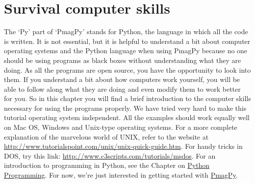 \documentclass[11pt]{book}
\begin{document}
{%
%
%
%





\chapter{Survival computer skills}
\label{ex:unix}

The `Py' part of  `PmagPy' stands for Python, the language in which all the code is written.   It is not essential, but it is helpful to understand a bit about computer operating systems and the Python language when using PmagPy because no one should be using programs as black boxes without understanding what they are doing. As all the programs are open source, you have the opportunity to look into them.  If you understand a bit  about how computers work yourself, you will be able to follow along what they are doing and even modify them to work better for you.   So in this chapter you will find a brief introduction to the computer skills necessary for using the programs properly.  We have tried very hard to make this tutorial operating system independent.  All the examples should work equally well on Mac OS, Windows and Unix-type operating systems.  For a more complete explanation of the marvelous world of UNIX, refer to the website at \url{http://www.tutorialspoint.com/unix/unix-quick-guide.htm}.  For handy tricks in DOS, try this link:  \url{http://www.c3scripts.com/tutorials/msdos}.
For an introduction to programming in Python, see the  Chapter on \href{#Python}{Python Programming}.   For now, we're just interested in getting started with \href{#PmagPy}{PmagPy}.


}
\end{document}
